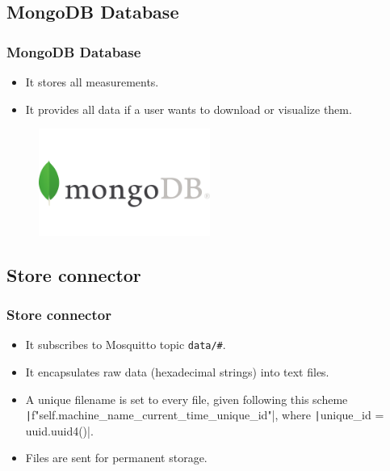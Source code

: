 \subsection{MongoDB Database}
\begin{frame}
	\frametitle{MongoDB Database}
	
	\begin{itemize}
		\item It stores all measurements.
		\item It provides all data if a user wants to download or visualize them.
	\end{itemize}
	
	\begin{figure}[h]
		\centering
		\includegraphics[width=0.5\textwidth]{./img/MongoDB-Logo.png}
	\end{figure}
\end{frame}


\subsection{Store connector}
\begin{frame}[containsverbatim]
	\frametitle{Store connector}
	
	\begin{itemize}
		\item It subscribes to Mosquitto topic \verb|data/#|.
		\item It encapsulates raw data (hexadecimal strings) into text files.
		\item A unique filename is set to every file, given following this scheme
			\texttt|f"{self.machine_name}_{current_time}_{unique_id}"|,
			where \texttt|unique_id = uuid.uuid4()|.
		\item Files are sent for permanent storage.
	\end{itemize}
	
\end{frame}

